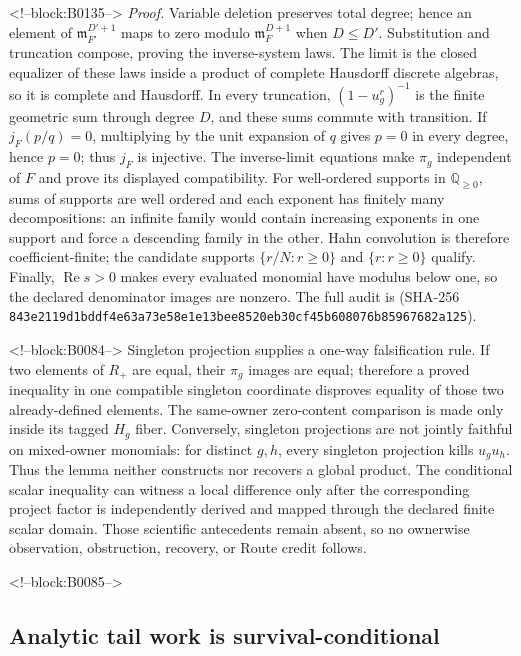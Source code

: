 \documentclass[11pt]{article}
\begin{document}
<!--block:B0135-->
\emph{Proof.}  Variable deletion preserves total degree; hence an element of
\(\mathfrak m_{F'}^{D'+1}\) maps to zero modulo
\(\mathfrak m_F^{D+1}\) when \(D\leq D'\).  Substitution and truncation
compose, proving the inverse-system laws.  The limit is the closed equalizer of
these laws inside a product of complete Hausdorff discrete algebras, so it is
complete and Hausdorff.  In every truncation, \((1-u_g^r)^{-1}\) is the finite
geometric sum through degree \(D\), and these sums commute with transition.  If
\(j_F(p/q)=0\), multiplying by the unit expansion of \(q\) gives \(p=0\) in
every degree, hence \(p=0\); thus \(j_F\) is injective.  The inverse-limit
equations make \(\pi_g\) independent of \(F\) and prove its displayed
compatibility.  For well-ordered supports in \(\mathbb Q_{\geq0}\), sums of
supports are well ordered and each exponent has finitely many decompositions:
an infinite family would contain increasing exponents in one support and force
a descending family in the other.  Hahn convolution is therefore
coefficient-finite; the candidate supports \(\{r/N:r\geq0\}\) and
\(\{r:r\geq0\}\) qualify.  Finally, \(\operatorname{Re}s>0\) makes every
evaluated monomial have modulus below one, so the declared denominator images
are nonzero.  The full audit is
 (SHA-256
\texttt{843e2119\allowbreak{}d1bddf4e\allowbreak{}63a73e58\allowbreak{}e1e13bee\allowbreak{}8520eb30\allowbreak{}cf45b608\allowbreak{}076b8596\allowbreak{}7682a125}).

<!--block:B0084-->
Singleton projection supplies a one-way falsification rule.  If two
elements of \(R_+\) are equal, their \(\pi_g\) images are equal; therefore a
proved inequality in one compatible singleton coordinate disproves equality of
those two already-defined elements.  The same-owner zero-content comparison is
made only inside its tagged \(H_g\) fiber.  Conversely, singleton projections
are not jointly faithful on mixed-owner monomials: for distinct \(g,h\), every
singleton projection kills \(u_gu_h\).  Thus the lemma neither constructs nor
recovers a global product.  The conditional scalar inequality can witness a
local difference only after the corresponding project factor is independently
derived and mapped through the declared finite scalar domain.  Those scientific
antecedents remain absent, so no ownerwise observation, obstruction, recovery,
or Route credit follows.

<!--block:B0085-->
\hypertarget{46-analytic-tail-work-is-survival-conditional}{%
\subsection{Analytic tail work is
survival-conditional}\label{46-analytic-tail-work-is-survival-conditional}}
\end{document}
